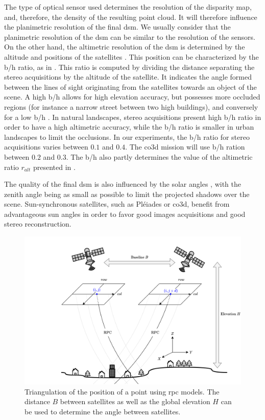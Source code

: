 The type of optical sensor used determines the resolution of the disparity map, and, therefore, the density of the resulting point cloud. It will therefore influence the planimetric resolution of the final \acrshort{dsm}. We usually consider that the planimetric resolution of the \acrshort{dsm} can be similar to the resolution of the sensors. On the other hand, the altimetric resolution of the \acrshort{dsm} is determined by the altitude and positions of the satellites \cite{qin_critical_2019}. This position can be characterized by the \acrfull{b/h} ratio, as in . This ratio is computed by dividing the distance separating the stereo acquisitions by the altitude of the satellite. It indicates the angle formed between the lines of sight originating from the satellites towards an object of the scene. A high \acrshort{b/h} allows for high elevation accuracy, but possesses more occluded regions (for instance a narrow street between two high buildings), and conversely for a low \acrshort{b/h} \cite{delon_small_2007}. In natural landscapes, stereo acquisitions present high \acrshort{b/h} ratio in order to have a high altimetric accuracy, while the \acrshort{b/h} ratio is smaller in urban landscapes to limit the occlusions.  In our experiments, the \acrshort{b/h} ratio for stereo acquisitions varies between $0.1$ and $0.4$. The \acrshort{co3d} mission will use \acrshort{b/h} ration between $0.2$ and $0.3$. The \acrshort{b/h} also partly determines the value of the altimetric ratio $r_{alt}$ presented in .

The quality of the final \acrshort{dsm} is also influenced by the solar angles \cite{qin_critical_2019}, with the zenith angle being as small as possible to limit the projected shadows over the scene. Sun-synchronous satellites, such as Pléiades or \acrshort{co3d}, benefit from advantageous sun angles in order to favor good images acquisitions and good stereo reconstruction.

\begin{figure}
    \centering
    \includegraphics[width=0.8\linewidth]{Images/Chap_1/RPC.png}
    \caption{Triangulation of the position of a point using \acrshort{rpc} models. The distance $B$ between satellites as well as the global elevation $H$ can be used to determine the angle between satellites.}
    \label{fig:RPC}
\end{figure}

